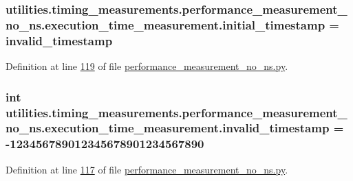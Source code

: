\subsubsection[{initial\+\_\+timestamp}]{\setlength{\rightskip}{0pt plus 5cm}utilities.\+timing\+\_\+measurements.\+performance\+\_\+measurement\+\_\+no\+\_\+ns.\+execution\+\_\+time\+\_\+measurement.\+initial\+\_\+timestamp = {\bf invalid\+\_\+timestamp}\hspace{0.3cm}{\ttfamily [static]}}\label{classutilities_1_1timing__measurements_1_1performance__measurement__no__ns_1_1execution__time__measurement_a75ac358ee6e04eba517fd6dd429c99a1}


Definition at line \hyperlink{performance__measurement__no__ns_8py_source_l00119}{119} of file \hyperlink{performance__measurement__no__ns_8py_source}{performance\+\_\+measurement\+\_\+no\+\_\+ns.\+py}.

\hypertarget{classutilities_1_1timing__measurements_1_1performance__measurement__no__ns_1_1execution__time__measurement_ac0b6b9477824b6d0b0e1348864d55566}{}
\subsubsection[{invalid\+\_\+timestamp}]{\setlength{\rightskip}{0pt plus 5cm}int utilities.\+timing\+\_\+measurements.\+performance\+\_\+measurement\+\_\+no\+\_\+ns.\+execution\+\_\+time\+\_\+measurement.\+invalid\+\_\+timestamp = -\/123456789012345678901234567890\hspace{0.3cm}{\ttfamily [static]}}\label{classutilities_1_1timing__measurements_1_1performance__measurement__no__ns_1_1execution__time__measurement_ac0b6b9477824b6d0b0e1348864d55566}


Definition at line \hyperlink{performance__measurement__no__ns_8py_source_l00117}{117} of file \hyperlink{performance__measurement__no__ns_8py_source}{performance\+\_\+measurement\+\_\+no\+\_\+ns.\+py}.

